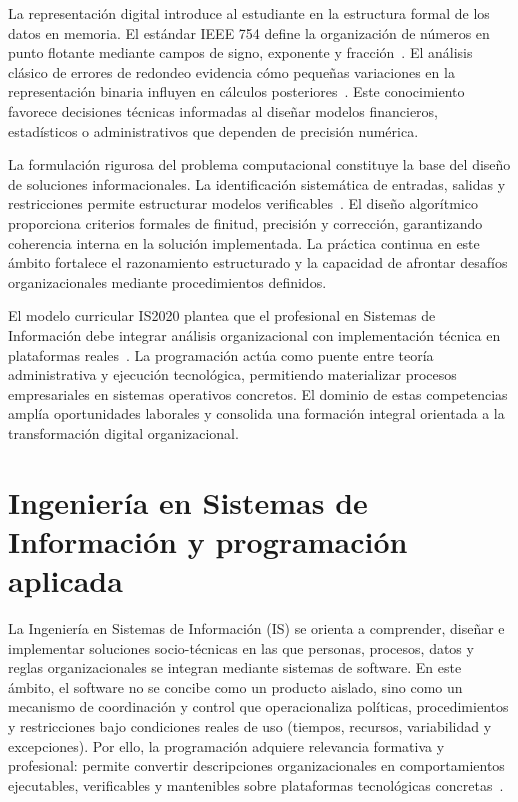 \documentclass[12pt,twoside]{book}
\begin{document}
			La representación digital introduce al estudiante en la estructura formal de los datos en memoria. El estándar IEEE 754 define la organización de números en punto flotante mediante campos de signo, exponente y fracción~\cite{IEEE2019Standard754}. El análisis clásico de errores de redondeo evidencia cómo pequeñas variaciones en la representación binaria influyen en cálculos posteriores~\cite{Goldberg1991What}. Este conocimiento favorece decisiones técnicas informadas al diseñar modelos financieros, estadísticos o administrativos que dependen de precisión numérica.
			
			La formulación rigurosa del problema computacional constituye la base del diseño de soluciones informacionales. La identificación sistemática de entradas, salidas y restricciones permite estructurar modelos verificables~\cite{Wirth1976Algorithms}. El diseño algorítmico proporciona criterios formales de finitud, precisión y corrección, garantizando coherencia interna en la solución implementada. La práctica continua en este ámbito fortalece el razonamiento estructurado y la capacidad de afrontar desafíos organizacionales mediante procedimientos definidos.
			
			El modelo curricular IS2020 plantea que el profesional en Sistemas de Información debe integrar análisis organizacional con implementación técnica en plataformas reales~\cite{Leidig2020Updating,Leidig2021Competency}. La programación actúa como puente entre teoría administrativa y ejecución tecnológica, permitiendo materializar procesos empresariales en sistemas operativos concretos. El dominio de estas competencias amplía oportunidades laborales y consolida una formación integral orientada a la transformación digital organizacional.
				
			\section{Ingeniería en Sistemas de Información y programación aplicada}
				\noindent
				La Ingeniería en Sistemas de Información (IS) se orienta a comprender, diseñar e implementar soluciones socio-técnicas en las que personas, procesos, datos y reglas organizacionales se integran mediante sistemas de software. En este ámbito, el software no se concibe como un producto aislado, sino como un mecanismo de coordinación y control que operacionaliza políticas, procedimientos y restricciones bajo condiciones reales de uso (tiempos, recursos, variabilidad y excepciones). Por ello, la programación adquiere relevancia formativa y profesional: permite convertir descripciones organizacionales en comportamientos ejecutables, verificables y mantenibles sobre plataformas tecnológicas concretas~\cite{Kendall2014Systems,Laudon2020Management,Tegarden2025Systems}.
				
\end{document}
